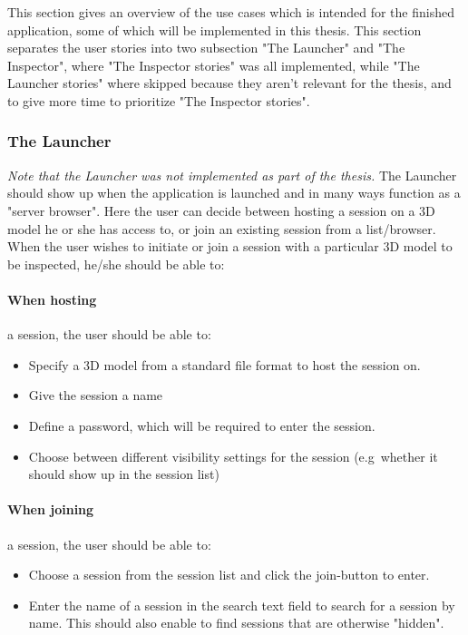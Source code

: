 This section gives an overview of the use cases which is intended for the finished application, some of which will be implemented in this thesis. 
This section separates the user stories into two subsection "The Launcher" and "The Inspector", where "The Inspector stories" was all implemented, while
"The Launcher stories" where skipped because they aren't relevant for the thesis, and to give more time to prioritize "The Inspector stories".

\subsubsection{The Launcher}
\textit{Note that the Launcher was not implemented as part of the thesis.}
The Launcher should show up when the application is launched and in many ways function as a "server browser".
Here the user can decide between hosting a session on a 3D model he or she has access to, or join an existing session from a list/browser.
When the user wishes to initiate or join a session with a particular 3D model to be inspected, he/she should be able to:

\paragraph{When hosting}a session, the user should be able to:
\begin{itemize}
	\item Specify a 3D model from a standard file format to host the session on.
	\item Give the session a name
	\item Define a password, which will be required to enter the session. 
	\item Choose between different visibility settings for the session (e.g~whether it should show up in the session list)
\end{itemize}

\paragraph{When joining}a session, the user  should be able to:
\begin{itemize}
	\item Choose a session from the session list and click the join-button to enter.
	\item Enter the name of a session in the search text field to search for a session by name.
			This should also enable to find sessions that are otherwise "hidden".
\end{itemize}	

